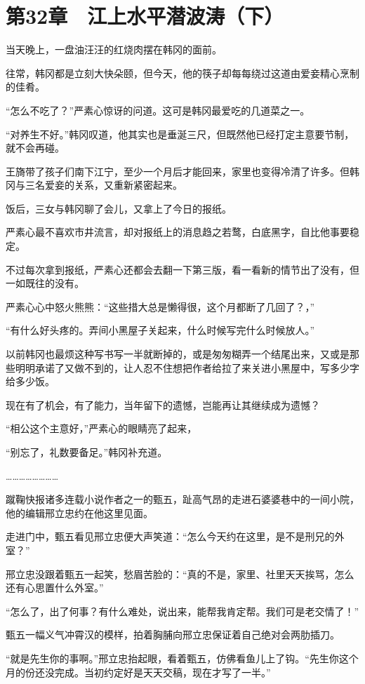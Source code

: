 \section{第32章　江上水平潜波涛（下）}

当天晚上，一盘油汪汪的红烧肉摆在韩冈的面前。

往常，韩冈都是立刻大快朵颐，但今天，他的筷子却每每绕过这道由爱妾精心烹制的佳肴。

“怎么不吃了？”严素心惊讶的问道。这可是韩冈最爱吃的几道菜之一。

“对养生不好。”韩冈叹道，他其实也是垂涎三尺，但既然他已经打定主意要节制，就不会再碰。

王旖带了孩子们南下江宁，至少一个月后才能回来，家里也变得冷清了许多。但韩冈与三名爱妾的关系，又重新紧密起来。

饭后，三女与韩冈聊了会儿，又拿上了今日的报纸。

严素心最不喜欢市井流言，却对报纸上的消息趋之若鹜，白底黑字，自比他事要稳定。

不过每次拿到报纸，严素心还都会去翻一下第三版，看一看新的情节出了没有，但一如既往的没有。

严素心心中怒火熊熊：“这些措大总是懒得很，这个月都断了几回了？，”

“有什么好头疼的。弄间小黑屋子关起来，什么时候写完什么时候放人。”

以前韩冈也最烦这种写书写一半就断掉的，或是匆匆糊弄一个结尾出来，又或是那些明明承诺了又做不到的，让人忍不住想把作者给拉了来关进小黑屋中，写多少字给多少饭。

现在有了机会，有了能力，当年留下的遗憾，岂能再让其继续成为遗憾？

“相公这个主意好，”严素心的眼睛亮了起来，

“别忘了，礼数要备足。”韩冈补充道。

……………………

蹴鞠快报诸多连载小说作者之一的甄五，趾高气昂的走进石婆婆巷中的一间小院，他的编辑邢立忠约在他这里见面。

走进门中，甄五看见邢立忠便大声笑道：“怎么今天约在这里，是不是刑兄的外室？”

邢立忠没跟着甄五一起笑，愁眉苦脸的：“真的不是，家里、社里天天挨骂，怎么还有心思置什么外室。”

“怎么了，出了何事？有什么难处，说出来，能帮我肯定帮。我们可是老交情了！”

甄五一幅义气冲霄汉的模样，拍着胸脯向邢立忠保证着自己绝对会两肋插刀。

“就是先生你的事啊。”邢立忠抬起眼，看着甄五，仿佛看鱼儿上了钩。“先生你这个月的份还没完成。当初约定好是天天交稿，现在才写了一半。”

